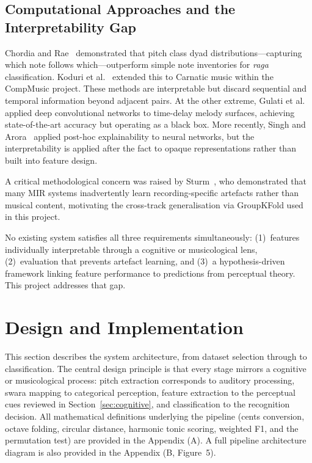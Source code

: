 \documentclass[11pt,a4paper]{article}
\begin{document}
{\subsection{Computational Approaches and the Interpretability Gap}
\label{sec:computational}

Chordia and Rae~\cite{chordia2007} demonstrated that pitch class dyad distributions---capturing which note follows which---outperform simple note inventories for \textit{raga} classification. Koduri et al.~\cite{koduri2012} extended this to Carnatic music within the CompMusic project. These methods are interpretable but discard sequential and temporal information beyond adjacent pairs. At the other extreme, Gulati et al.~\cite{gulati2016} applied deep convolutional networks to time-delay melody surfaces, achieving state-of-the-art accuracy but operating as a black box. More recently, Singh and Arora~\cite{singh2024} applied post-hoc explainability to neural networks, but the interpretability is applied after the fact to opaque representations rather than built into feature design.

A critical methodological concern was raised by Sturm~\cite{sturm2014}, who demonstrated that many MIR systems inadvertently learn recording-specific artefacts rather than musical content, motivating the cross-track generalisation via GroupKFold used in this project.

No existing system satisfies all three requirements simultaneously: (1)~features individually interpretable through a cognitive or musicological lens, (2)~evaluation that prevents artefact learning, and (3)~a hypothesis-driven framework linking feature performance to predictions from perceptual theory. This project addresses that gap.

\section{Design and Implementation}

This section describes the system architecture, from dataset selection through to classification. The central design principle is that every stage mirrors a cognitive or musicological process: pitch extraction corresponds to auditory processing, swara mapping to categorical perception, feature extraction to the perceptual cues reviewed in Section~\ref{sec:cognitive}, and classification to the recognition decision. All mathematical definitions underlying the pipeline (cents conversion, octave folding, circular distance, harmonic tonic scoring, weighted F1, and the permutation test) are provided in the Appendix (A). A full pipeline architecture diagram is also provided in the Appendix (B, Figure~5).

}
\end{document}
